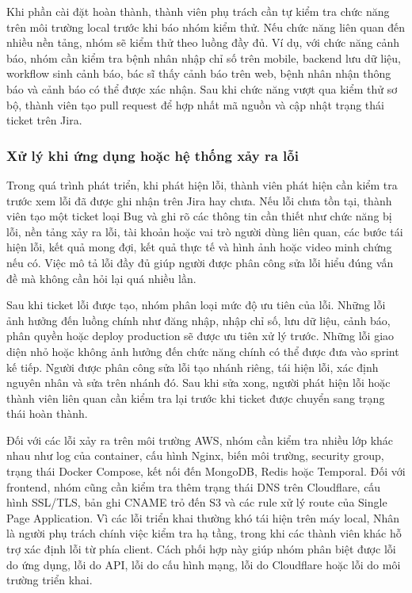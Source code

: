 \par Khi phần cài đặt hoàn thành, thành viên phụ trách cần tự kiểm tra chức năng trên môi trường local trước khi báo nhóm kiểm thử. Nếu chức năng liên quan đến nhiều nền tảng, nhóm sẽ kiểm thử theo luồng đầy đủ. Ví dụ, với chức năng cảnh báo, nhóm cần kiểm tra bệnh nhân nhập chỉ số trên mobile, backend lưu dữ liệu, workflow sinh cảnh báo, bác sĩ thấy cảnh báo trên web, bệnh nhân nhận thông báo và cảnh báo có thể được xác nhận. Sau khi chức năng vượt qua kiểm thử sơ bộ, thành viên tạo pull request để hợp nhất mã nguồn và cập nhật trạng thái ticket trên Jira.

\subsubsection{Xử lý khi ứng dụng hoặc hệ thống xảy ra lỗi}
\par Trong quá trình phát triển, khi phát hiện lỗi, thành viên phát hiện cần kiểm tra trước xem lỗi đã được ghi nhận trên Jira hay chưa. Nếu lỗi chưa tồn tại, thành viên tạo một ticket loại Bug và ghi rõ các thông tin cần thiết như chức năng bị lỗi, nền tảng xảy ra lỗi, tài khoản hoặc vai trò người dùng liên quan, các bước tái hiện lỗi, kết quả mong đợi, kết quả thực tế và hình ảnh hoặc video minh chứng nếu có. Việc mô tả lỗi đầy đủ giúp người được phân công sửa lỗi hiểu đúng vấn đề mà không cần hỏi lại quá nhiều lần.

\par Sau khi ticket lỗi được tạo, nhóm phân loại mức độ ưu tiên của lỗi. Những lỗi ảnh hưởng đến luồng chính như đăng nhập, nhập chỉ số, lưu dữ liệu, cảnh báo, phân quyền hoặc deploy production sẽ được ưu tiên xử lý trước. Những lỗi giao diện nhỏ hoặc không ảnh hưởng đến chức năng chính có thể được đưa vào sprint kế tiếp. Người được phân công sửa lỗi tạo nhánh riêng, tái hiện lỗi, xác định nguyên nhân và sửa trên nhánh đó. Sau khi sửa xong, người phát hiện lỗi hoặc thành viên liên quan cần kiểm tra lại trước khi ticket được chuyển sang trạng thái hoàn thành.

\par Đối với các lỗi xảy ra trên môi trường AWS, nhóm cần kiểm tra nhiều lớp khác nhau như log của container, cấu hình Nginx, biến môi trường, security group, trạng thái Docker Compose, kết nối đến MongoDB, Redis hoặc Temporal. Đối với frontend, nhóm cũng cần kiểm tra thêm trạng thái DNS trên Cloudflare, cấu hình SSL/TLS, bản ghi CNAME trỏ đến S3 và các rule xử lý route của Single Page Application. Vì các lỗi triển khai thường khó tái hiện trên máy local, Nhân là người phụ trách chính việc kiểm tra hạ tầng, trong khi các thành viên khác hỗ trợ xác định lỗi từ phía client. Cách phối hợp này giúp nhóm phân biệt được lỗi do ứng dụng, lỗi do API, lỗi do cấu hình mạng, lỗi do Cloudflare hoặc lỗi do môi trường triển khai.

